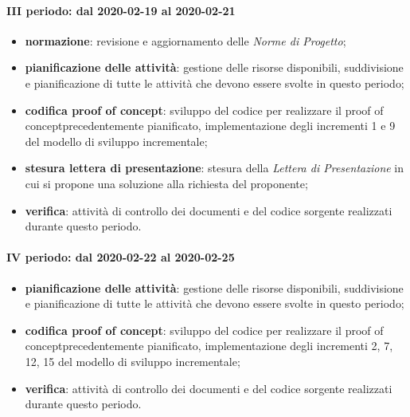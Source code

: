 \paragraph*{III periodo: dal 2020-02-19 al 2020-02-21}
\begin{itemize}
	\item \textbf{normazione}: revisione e aggiornamento delle \textit{Norme di Progetto};
	\item \textbf{pianificazione delle attività}: gestione delle risorse disponibili, suddivisione e pianificazione di tutte le attività che devono essere svolte in questo periodo;
	\item \textbf{codifica proof of concept}\glo: sviluppo del codice per realizzare il proof of concept\glosp precedentemente pianificato, implementazione degli incrementi 1 e 9 del modello di sviluppo incrementale;
	\item \textbf{stesura lettera di presentazione}: stesura della \textit{Lettera di Presentazione} in cui si propone una soluzione alla richiesta del proponente;
	\item \textbf{verifica}: attività di controllo dei documenti e del codice sorgente realizzati durante questo periodo.
\end{itemize}

\paragraph*{IV periodo: dal 2020-02-22 al 2020-02-25}
\begin{itemize}
	\item \textbf{pianificazione delle attività}: gestione delle risorse disponibili, suddivisione e pianificazione di tutte le attività che devono essere svolte in questo periodo;
	\item \textbf{codifica proof of concept}\glo: sviluppo del codice per realizzare il proof of concept\glosp precedentemente pianificato, implementazione degli incrementi 2, 7, 12, 15 del modello di sviluppo incrementale;
	\item \textbf{verifica}: attività di controllo dei documenti e del codice sorgente realizzati durante questo periodo.
\end{itemize}


